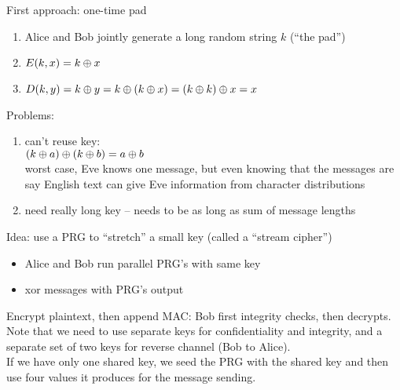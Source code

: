 
First approach: one-time pad
\begin{enumerate}
    \item Alice and Bob jointly generate a long random string $k$ (``the pad'')
    \item $E(k, x) = k \oplus x$
    \item $D(k, y) = k \oplus y = k \oplus (k \oplus x) = (k \oplus k) \oplus x = x$
\end{enumerate}
Problems:
\begin{enumerate}
    \item can't reuse key:\\
        $(k \oplus a) \oplus (k \oplus b) = a \oplus b$\\
        worst case, Eve knows one message, but even knowing that the messages
        are say English text can give Eve information from character
        distributions
    \item need really long key -- needs to be as long as sum of message lengths
\end{enumerate}
Idea: use a PRG to ``stretch'' a small key (called a ``stream cipher'')
\begin{itemize}
    \item Alice and Bob run parallel PRG's with same key
    \item xor messages with PRG's output
\end{itemize}

Encrypt plaintext, then append MAC: Bob first integrity checks, then decrypts.
Note that we need to use separate keys for confidentiality and integrity, and a
separate set of two keys for reverse channel (Bob to Alice).\\

If we have only one shared key, we seed the PRG with the shared key and then use
four  values it produces for the message sending.
